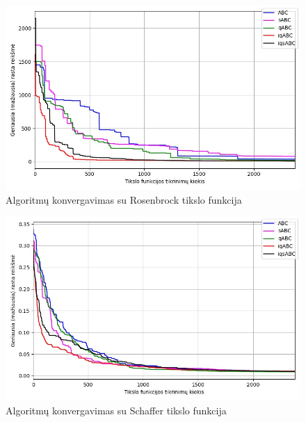 \documentclass{VUMIFPSmagistrinis}
\begin{document}
\begin{landscape}
\begin{multicols}{2}
\begin{figure}[H]
    \centering
    \includegraphics[scale=0.45]{img/2kv/all_rosenbrock.jpg}
     \caption{Algoritmų konvergavimas su Rosenbrock tikslo funkcija}
    \label{img:kon6}
\end{figure}

\begin{figure}[H]
    \centering
    \includegraphics[scale=0.45]{img/2kv/all_schaffer.jpg}
     \caption{Algoritmų konvergavimas su Schaffer tikslo funkcija}
    \label{img:kon7a}
\end{figure}





\end{multicols}\newpage
\begin{multicols}{2}


\end{multicols}
\end{landscape}
\end{document}

